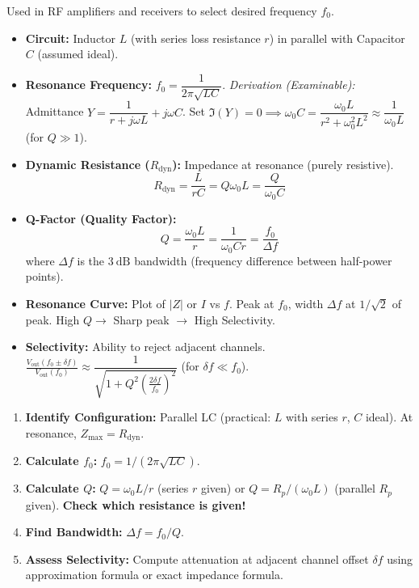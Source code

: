 \documentclass[11pt]{article}
\begin{document}
\begin{propriete}
Used in RF amplifiers and receivers to select desired frequency $f_0$.
\begin{itemize}
\item \textbf{Circuit:} Inductor $L$ (with series loss resistance $r$) in parallel with Capacitor $C$ (assumed ideal).
\item \textbf{Resonance Frequency:} $f_0 = \dfrac{1}{2\pi\sqrt{LC}}$. \emph{Derivation (Examinable):} Admittance $Y = \dfrac{1}{r+j\omega L} + j\omega C$. Set $\Im(Y)=0 \implies \omega_0 C = \dfrac{\omega_0 L}{r^2+\omega_0^2 L^2} \approx \dfrac{1}{\omega_0 L}$ (for $Q\gg 1$).
\item \textbf{Dynamic Resistance ($R_{\mathrm{dyn}}$):} Impedance at resonance (purely resistive).
\[
R_{\mathrm{dyn}} = \dfrac{L}{rC} = Q \omega_0 L = \dfrac{Q}{\omega_0 C}
\]
\item \textbf{Q-Factor (Quality Factor):}
\[
Q = \dfrac{\omega_0 L}{r} = \dfrac{1}{\omega_0 C r} = \dfrac{f_0}{\Delta f}
\]
where $\Delta f$ is the $3\ \mathrm{dB}$ bandwidth (frequency difference between half-power points).
\item \textbf{Resonance Curve:} Plot of $|Z|$ or $I$ vs $f$. Peak at $f_0$, width $\Delta f$ at $1/\sqrt{2}$ of peak. High $Q \to$ Sharp peak $\to$ High Selectivity.
\item \textbf{Selectivity:} Ability to reject adjacent channels. $\frac{V_{\mathrm{out}}(f_0 \pm \delta f)}{V_{\mathrm{out}}(f_0)} \approx \dfrac{1}{\sqrt{1 + Q^2 \left( \frac{2\delta f}{f_0} \right)^2}}$ (for $\delta f \ll f_0$).
\end{itemize}
\end{propriete}

\begin{methode}
\begin{enumerate}
\item \textbf{Identify Configuration:} Parallel LC (practical: $L$ with series $r$, $C$ ideal). At resonance, $Z_{\max} = R_{\mathrm{dyn}}$.
\item \textbf{Calculate $f_0$:} $f_0 = 1/(2\pi\sqrt{LC})$.
\item \textbf{Calculate $Q$:} $Q = \omega_0 L / r$ (series $r$ given) or $Q = R_p / (\omega_0 L)$ (parallel $R_p$ given). \textbf{Check which resistance is given!}
\item \textbf{Find Bandwidth:} $\Delta f = f_0 / Q$.
\item \textbf{Assess Selectivity:} Compute attenuation at adjacent channel offset $\delta f$ using approximation formula or exact impedance formula.
\end{enumerate}
\end{methode}
\end{document}
